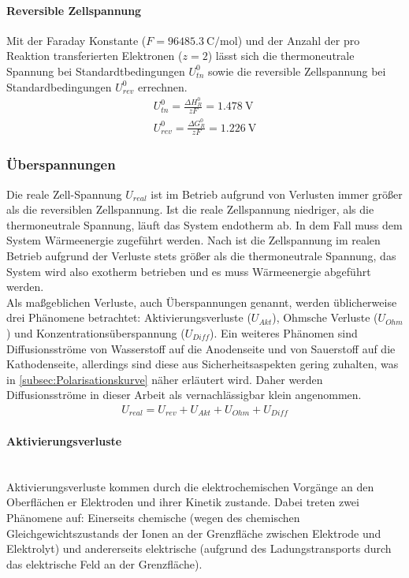 \paragraph{Reversible Zellspannung}
\label{par:rev Zellspannung}
Mit der Faraday Konstante ($F=\SI{96485,3}{\coulomb\per\mol}$) und der Anzahl der pro Reaktion transferierten Elektronen ($z = 2$) lässt sich die thermoneutrale Spannung bei Standardtbedingungen $U^0_{tn}$ sowie die reversible Zellspannung bei Standardbedingungen $U^0_{rev}$ errechnen.
\begin{align}
 U^0_{tn} = \frac{\Delta H^0_R}{zF} = \SI{1,478}{\volt}\\
 U^0_{rev} = \frac{\Delta G^0_R}{zF} = \SI{1,226}{\volt}
\end{align}


\subsubsection{Überspannungen}
\label{subsubsec:Überspannungen}
Die reale Zell-Spannung $U_{real}$ ist im Betrieb aufgrund von Verlusten immer größer als die reversiblen Zellspannung. Ist die reale Zellspannung niedriger, als die thermoneutrale Spannung, läuft das System endotherm ab. In dem Fall muss dem System Wärmeenergie zugeführt werden. Nach \cite{Low-temperature electrolysis system modelling: A review} ist die Zellspannung im realen Betrieb aufgrund der Verluste stets größer als die thermoneutrale Spannung, das System wird also exotherm betrieben und es muss Wärmeenergie abgeführt werden.\\
Als maßgeblichen Verluste, auch Überspannungen genannt, werden üblicherweise drei Phänomene betrachtet: Aktivierungsverluste ($U_{Akt}$), Ohmsche Verluste ($U_{Ohm}$) und Konzentrationsüberspannung ($U_{Diff}$)\cite{guideline}. Ein weiteres Phänomen sind Diffusionsströme von Wasserstoff auf die Anodenseite und von Sauerstoff auf die Kathodenseite, allerdings sind diese aus Sicherheitsaspekten gering zuhalten, was in \ref{subsec:Polarisationskurve} näher erläutert wird. Daher werden Diffusionsströme in dieser Arbeit als vernachlässigbar klein angenommen. 
\begin{align}
	\label{gl:U_real}
	U_{real} =  U_{rev} + U_{Akt} + U_{Ohm} + U_{Diff}
\end{align}   
\paragraph{Aktivierungsverluste} \ \\
Aktivierungsverluste kommen durch die elektrochemischen Vorgänge an den Oberflächen er Elektroden und ihrer Kinetik zustande. Dabei treten zwei Phänomene auf:  Einerseits chemische (wegen des chemischen Gleichgewichtszustands der Ionen an der Grenzfläche zwischen Elektrode und Elektrolyt) und andererseits elektrische (aufgrund des Ladungstransports durch das elektrische Feld an der Grenzfläche)\cite{Solid Oxide Electrolyzer Cell Modeling: A Review}.\\

